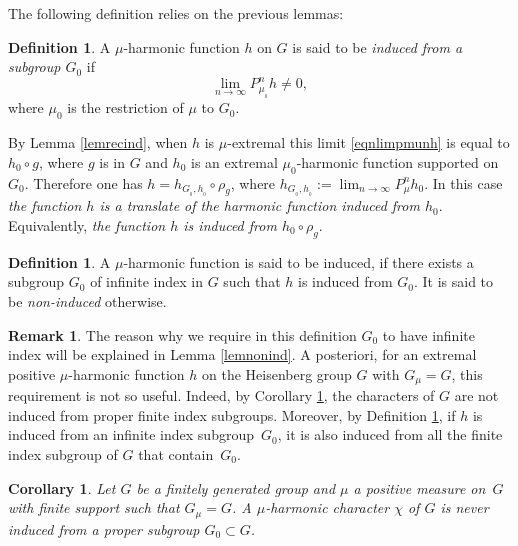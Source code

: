 \documentclass[11pt]{article}
\numberwithin{equation}{section}
\newtheorem{Cor}[Thm]{Corollary}
\theoremstyle{definition}
\newtheorem{Def}[Thm]{Definition}
\newtheorem{Rem}[Thm]{Remark}
\let\ra\to
\begin{document}
The following definition relies on the previous lemmas:

\begin{Def}

\label{defnonind}
A $\mu$-harmonic function $h$ on $G$
is said to be \emph{induced from a subgroup $G_0$}
if
\begin{equation}
\label{eqnlimpmunh}
\lim_{n\ra\infty}P_{\mu_{_0}}^nh\neq 0,
\end{equation}
where $\mu_0$ is the restriction of $\mu$ to $G_0$.

By Lemma \ref{lemrecind}, when $h$ is $\mu$-extremal this limit
\eqref{eqnlimpmunh} is equal to $h_0\circ g$, where
$g$ is in $G$ and
$h_0$ is an extremal $\mu_0$-harmonic function supported on $G_0$.
Therefore one has $h=h_{G_{_0},h_{_0}}\circ \rho_g$,
where $h_{G_{_0},h_{_0}}:=
\lim_{n\ra\infty}P_{\mu}^nh_0$.
In this case \emph{the function $h$ is a translate of
the harmonic function induced from $h_0$}.
Equivalently, \emph{the function $h$ is induced from $h_0\circ \rho_g$}.
\end{Def}

\begin{Def}

\label{defnonindsuite}
A $\mu$-harmonic function is said to be {induced},
if there exists a subgroup $G_0$ of infinite index in $G$
such that $h$ is induced from $G_0$.
It is said to be \emph{non-induced} otherwise.
\end{Def}

\begin{Rem}

The reason why we require in this definition $G_0$ to have infinite index
will be explained in Lemma \ref{lemnonind}.
A posteriori, for an extremal positive $\mu$-harmonic function
$h$ on the Heisenberg group $G$ with $G_\mu=G$,
this requirement is not so useful.
Indeed, by Corollary \ref{corconind}, the characters of $G$ are not induced
from proper finite index subgroups.
Moreover, by Definition \ref{defnonind}, if $h$ is induced from an infinite index subgroup~$G_0$, it is also induced from all the finite index subgroup of $G$ that contain~$G_0$.
\end{Rem}

\begin{Cor}
\label{corconind}
Let $G$ be a finitely generated group and
$\mu$ a positive measure on~$G$ with finite support such that $G_\mu=G$.
A $\mu$-harmonic character $\chi$ of $G$
is never induced from a proper subgroup $G_0\subset G$.
\end{Cor}
\end{document}
